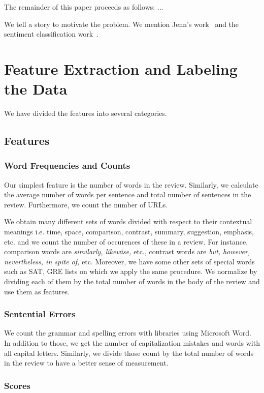 \documentclass[letterpaper]{article}
\begin{document}
The remainder of this paper proceeds as follows: ...


We tell a story to motivate the problem. We mention Jenn's
work~\cite{JennLearnDiffDomains} and the sentiment classification
work~\cite{PangSentimentClassification}.

\section{Feature Extraction and Labeling the Data}
We have divided the features into several categories.
\subsection{Features}
\label{sec:features}
\subsubsection{Word Frequencies and Counts}
Our simplest feature is the number of words in the review. Similarly,
we calculate the average number of words per sentence and
total number of sentences in the review. Furthermore, we count the
number of URLs.

We obtain many different sets of words divided with respect to their
contextual meanings i.e. time, space, comparison, contrast, summary,
suggestion, emphasis, etc. and we count the number of occurences of
these in a review. For instance, comparison words are
\emph{similarly, likewise,} etc., contrast words are \emph{but,
  however, nevertheless, in spite of,} etc. Moreover, we have some
other sets of special words such as SAT, GRE lists on which we apply the same procedure.  We normalize by dividing each of them by the total
number of words in the body of the review and use them as features.   

\subsubsection{Sentential Errors}
We count the grammar and spelling errors with libraries using
Microsoft Word. In addition to those, we get the number of
capitalization mistakes and words with all capital letters. Similarly, we
divide those count by the total number of words in the review to have
a better sense of measurement.  

\subsubsection{Scores}
\end{document}
